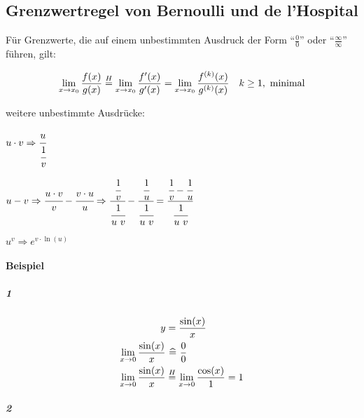 \subsection{Grenzwertregel von Bernoulli und de l’Hospital}

Für Grenzwerte, die auf einem unbestimmten Ausdruck der Form \enquote{\( \frac{0}{0} \)} oder \enquote{\( \frac{\infty}{\infty} \)} führen, gilt:

\[
	\lim_{x \rightarrow{} x_0} \frac{f(x)}{g(x)} \overset{H}{=}
	\lim_{x \rightarrow{} x_0} \frac{f'(x)}{g'(x)} =
	\lim_{x \rightarrow{} x_0} \frac{f^{(k)}(x)}{g^{(k)}(x)}
	\quad k \geq 1,\ \text{minimal}
\]

weitere unbestimmte Ausdrücke:

\begin{description}[style=nextline]
	\item[\( 0 \cdot \infty,\ \infty \cdot 0 \)]
	      \( u \cdot v
	      \Rightarrow \cfrac{u}{\cfrac{1}{v}} \)
	\item[\( \infty - \infty \)]
	      \( u - v
	      \Rightarrow \cfrac{u \cdot v}{v} - \cfrac{v \cdot u}{u}
	      \Rightarrow \cfrac{\cfrac{1}{v}}{\cfrac{1}{u\ v}} - \cfrac{\cfrac{1}{u}}{\cfrac{1}{u\ v}} = \cfrac{\cfrac{1}{v}-\cfrac{1}{u}}{\cfrac{1}{u\ v}} \)
	\item[\( 0^0,\ \infty^0,\ 1^\infty \)]
	      \(
	      u^v \Rightarrow e^{v \cdot \ln(u)}
	      \)
\end{description}

\paragraph{Beispiel}

\subparagraph{1}

\begin{align*}
	y                               & = \frac{\sin(x)}{x}                                \\
	\lim_{x \rightarrow{} 0} \frac{\sin(x)}{x} & \ \widehat{=}\  \frac{0}{0}                            \\
	\lim_{x \rightarrow{} 0} \frac{\sin(x)}{x} & \overset{H}{=} \lim_{x \rightarrow{} 0} \frac{\cos(x)}{1} = 1
\end{align*}

\subparagraph{2}


